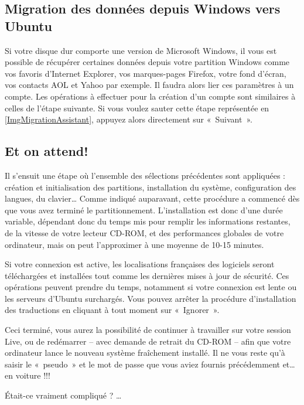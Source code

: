 \subsection{Migration des données depuis Windows vers Ubuntu}
Si votre disque dur comporte une version de Microsoft Windows, il vous est possible de récupérer certaines données depuis votre partition Windows comme vos favoris d'Internet Explorer, vos marques-pages Firefox, votre fond d'écran, vos contacts AOL et Yahoo par exemple. Il faudra alors lier ces paramètres à un compte. Les opérations à effectuer pour la création d'un compte sont similaires à celles de l'étape suivante. Si vous voulez sauter cette étape représentée en \ref{ImgMigrationAssistant}, appuyez alors directement sur «~Suivant~».\par
\subsection{Et on attend!}
Il s'ensuit une étape où l'ensemble des sélections précédentes sont appliquées : création et initialisation des partitions, installation du système, configuration des langues, du clavier\ldots{} Comme indiqué auparavant, cette procédure a commencé dès que vous avez terminé le partitionnement. L'installation est donc d'une durée variable, dépendant donc du temps mis pour remplir les informations restantes, de la vitesse de votre lecteur CD-ROM, et des performances globales de votre ordinateur, mais on peut l'approximer à une moyenne de 10-15 minutes.\par
{}
Si votre connexion  est active, les localisations françaises des logiciels seront téléchargées et installées tout comme les dernières mises à jour de sécurité. Ces opérations peuvent prendre du temps, notamment si votre connexion est lente ou les serveurs d'Ubuntu surchargés. Vous pouvez arrêter la procédure d'installation des traductions en cliquant à tout moment sur «~Ignorer~».\par
{}
Ceci terminé, vous aurez la possibilité de continuer à travailler sur votre session Live, ou de redémarrer -- avec demande de retrait du CD-ROM -- afin que votre ordinateur lance le nouveau système fraîchement installé. Il ne vous reste qu'à saisir le «~pseudo~» et le mot de passe que vous aviez fournis précédemment et\ldots{} en voiture !!!\par
{}
Était-ce vraiment compliqué ? \ldots{}
